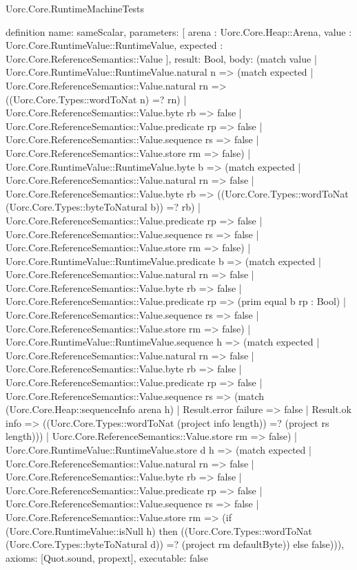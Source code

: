 \begin{lexlean}{Uorc.Core.RuntimeMachineTests}
\begin{semanticmodule}
definition{
  name: sameScalar,
  parameters: [
    arena : Uorc.Core.Heap::Arena,
    value : Uorc.Core.RuntimeValue::RuntimeValue,
    expected : Uorc.Core.ReferenceSemantics::Value
  ],
  result: Bool,
  body: (match value
    | Uorc.Core.RuntimeValue::RuntimeValue.natural n => (match expected
      | Uorc.Core.ReferenceSemantics::Value.natural rn => ((Uorc.Core.Types::wordToNat n) =? rn)
      | Uorc.Core.ReferenceSemantics::Value.byte rb => false
      | Uorc.Core.ReferenceSemantics::Value.predicate rp => false
      | Uorc.Core.ReferenceSemantics::Value.sequence rs => false
      | Uorc.Core.ReferenceSemantics::Value.store rm => false)
    | Uorc.Core.RuntimeValue::RuntimeValue.byte b => (match expected
      | Uorc.Core.ReferenceSemantics::Value.natural rn => false
      | Uorc.Core.ReferenceSemantics::Value.byte rb => ((Uorc.Core.Types::wordToNat (Uorc.Core.Types::byteToNatural b)) =? rb)
      | Uorc.Core.ReferenceSemantics::Value.predicate rp => false
      | Uorc.Core.ReferenceSemantics::Value.sequence rs => false
      | Uorc.Core.ReferenceSemantics::Value.store rm => false)
    | Uorc.Core.RuntimeValue::RuntimeValue.predicate b => (match expected
      | Uorc.Core.ReferenceSemantics::Value.natural rn => false
      | Uorc.Core.ReferenceSemantics::Value.byte rb => false
      | Uorc.Core.ReferenceSemantics::Value.predicate rp => (prim equal b rp : Bool)
      | Uorc.Core.ReferenceSemantics::Value.sequence rs => false
      | Uorc.Core.ReferenceSemantics::Value.store rm => false)
    | Uorc.Core.RuntimeValue::RuntimeValue.sequence h => (match expected
      | Uorc.Core.ReferenceSemantics::Value.natural rn => false
      | Uorc.Core.ReferenceSemantics::Value.byte rb => false
      | Uorc.Core.ReferenceSemantics::Value.predicate rp => false
      | Uorc.Core.ReferenceSemantics::Value.sequence rs => (match (Uorc.Core.Heap::sequenceInfo arena h)
        | Result.error failure => false
        | Result.ok info => ((Uorc.Core.Types::wordToNat (project info length)) =? (project rs length)))
      | Uorc.Core.ReferenceSemantics::Value.store rm => false)
    | Uorc.Core.RuntimeValue::RuntimeValue.store d h => (match expected
      | Uorc.Core.ReferenceSemantics::Value.natural rn => false
      | Uorc.Core.ReferenceSemantics::Value.byte rb => false
      | Uorc.Core.ReferenceSemantics::Value.predicate rp => false
      | Uorc.Core.ReferenceSemantics::Value.sequence rs => false
      | Uorc.Core.ReferenceSemantics::Value.store rm => (if (Uorc.Core.RuntimeValue::isNull h) then ((Uorc.Core.Types::wordToNat (Uorc.Core.Types::byteToNatural d)) =? (project rm defaultByte)) else false))),
  axioms: [Quot.sound, propext],
  executable: false
}


\end{semanticmodule}
\end{lexlean}
